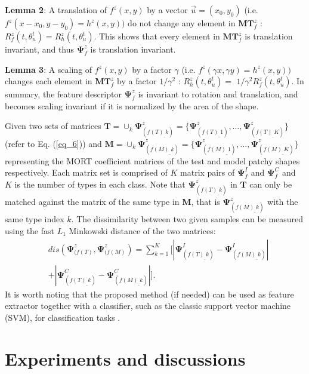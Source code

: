 \documentclass[letterpaper]{article} %
\begin{document}
\textbf{Lemma 2}: A translation of $f^z (x,y)$ by a vector $
\Vec{u}=(x_0,y_0)$ (i.e. $f^z (x-x_0,y-y_0 )=h^z (x,y))$ do not change any element in $\boldsymbol{MT}_f^z$ : $R_f^z (t,\theta_u^t )=R_h^z (t,\theta_u^t )$. This shows that every element in $\boldsymbol{MT}_f^z$ is translation invariant, and thus $\boldsymbol{\Psi}_f^z$ is translation invariant.

\textbf{Lemma 3}: A scaling of $f^z (x,y)$ by a factor $\gamma$ (i.e. $f^z (\gamma x,\gamma y)=h^z (x,y))$ changes each element in $\boldsymbol{MT}_f^z$ by a factor $1/\gamma^2$ : $R_h^z (t,\theta_u^t )=$  $1/\gamma^2 R_f^z (t,\theta_u^t )$.  In summary, the feature descriptor $\boldsymbol{\Psi}_f^z$ is invariant to rotation and translation, and becomes scaling invariant if it is normalized by the area of the shape.

Given two sets of matrices $\boldsymbol{T}= \cup_k \boldsymbol{\Psi}^z_{(f(T)_\_k)} =\{ \boldsymbol{\Psi}^z_{(f(T)_\_1)} ,\dots, \boldsymbol{\Psi}^z_{(f(T)_\_K)} \}$ (refer to Eq. (\ref{eq_6})) and $\boldsymbol{M}= \cup_k \boldsymbol{\Psi}^z_{(f(M)_\_k)} =\{ \boldsymbol{\Psi}^z_{(f(M)_\_1)} ,\dots, \boldsymbol{\Psi}^z_{(f(M)_\_K)} \}$ representing the MORT coefficient matrices of the test and model patchy shapes respectively. Each matrix set is comprised of $K$ matrix pairs of $\boldsymbol{\Psi}^I_f$ and $\boldsymbol{\Psi}^C_f$ and $K$ is the number of types in each class. Note that $\boldsymbol{\Psi}^z_{(f(T)_\_k)}$ in $\boldsymbol{T}$ can only be matched against the matrix of the same type in $\boldsymbol{M}$, that is $\boldsymbol{\Psi}^z_{(f(M)_\_k)}$  with the same type index $k$.
The dissimilarity between two given samples can be measured using the fast $L_1$ Minkowski distance of the two matrices:
\begin{equation}
\begin{aligned}
    & dis(\boldsymbol{\Psi}^z_{(f(T)},\boldsymbol{\Psi}^z_{(f(M)})
    = \sum_{k=1}^K[|\boldsymbol{\Psi}^I_{(f(T)_\_k)}-\boldsymbol{\Psi}^I_{(f(M)_\_k)}| \\
    & +|\boldsymbol{\Psi}^C_{(f(T)_\_k)}-\boldsymbol{\Psi}^C_{(f(M)_\_k)}|].
\end{aligned}
\label{eq_7}
\end{equation}
It is worth noting that the proposed method (if needed) can be used as feature extractor together with a classifier, such as the classic support vector machine (SVM), for classification tasks \cite{17}.




\section{Experiments and discussions}
\end{document}
